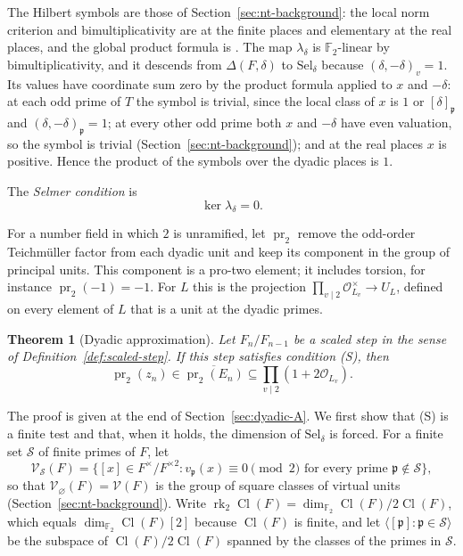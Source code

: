 \documentclass[11pt]{article}
\theoremstyle{plain}
\newtheorem{theorem}{Theorem}[section]
\theoremstyle{definition}
\theoremstyle{remark}
\DeclareMathOperator{\Cl}{Cl}
\newcommand{\F}{\mathbb F}
\newcommand{\OO}{\mathcal O}
\begin{document}
The Hilbert symbols are those of Section~\ref{sec:nt-background}: the
local norm criterion and bimultiplicativity are
\cite[Chapter~III, Theorem~4.4]{MilneCFT} at the finite places and
elementary at the real places, and the global product formula
is \cite[Chapter~V, Example~5.4]{MilneCFT}.  The map $\lambda_\delta$ is
$\F_2$-linear by bimultiplicativity, and it descends from
$\Delta(F,\delta)$ to $\mathrm{Sel}_\delta$ because
$(\delta,-\delta)_v=1$.  Its values have coordinate sum zero by the
product formula applied to $x$ and $-\delta$: at each odd prime of $T$
the symbol is trivial, since the local class of $x$ is $1$ or
$[\delta]_{\mathfrak p}$ and $(\delta,-\delta)_{\mathfrak p}=1$; at every
other odd prime both $x$ and $-\delta$ have even valuation, so the symbol
is trivial (Section~\ref{sec:nt-background}); and at the real places $x$
is positive.  Hence the product of the symbols over the dyadic places is
$1$.

The \emph{Selmer condition} is
\begin{equation}\label{eq:S}
 \tag{S} \ker\lambda_\delta=0.
\end{equation}

For a number field in which $2$ is unramified, let $\operatorname{pr}_2$
remove the odd-order Teichm\"uller factor from each dyadic unit and keep
its component in the group of principal units.  This component is a
pro-two element; it includes torsion, for instance
$\operatorname{pr}_2(-1)=-1$.  For $L$ this is the projection
$\prod_{v\mid2}\OO_{L_v}^\times\to U_L$, defined on every element of $L$
that is a unit at the dyadic primes.

\begin{theorem}[Dyadic approximation]\label{thm:dyadic}
Let $F_n/F_{n-1}$ be a scaled step in the sense of
Definition~\ref{def:scaled-step}.  If this step satisfies condition
\textup{(S)}, then
\[
 \operatorname{pr}_2(z_n)\in\overline{\operatorname{pr}_2(E_n)}
 \subseteq\prod_{v\mid2}(1+2\OO_{L_v}).
\]
\end{theorem}

The proof is given at the end of Section~\ref{sec:dyadic-A}.  We first
show that (S) is a finite test and that, when it holds, the dimension of
$\mathrm{Sel}_\delta$ is forced.  For a finite set $\mathcal S$ of finite
primes of $F$, let
\[
 \mathcal V_{\mathcal S}(F)=\{[x]\in F^\times/F^{\times2}:
 v_{\mathfrak p}(x)\equiv0\pmod2\text{ for every prime }\mathfrak p\notin\mathcal S\},
\]
so that $\mathcal V_\varnothing(F)=\mathcal V(F)$ is the group of square
classes of virtual units (Section~\ref{sec:nt-background}).  Write
$\operatorname{rk}_2\Cl(F)=\dim_{\F_2}\Cl(F)/2\Cl(F)$, which equals
$\dim_{\F_2}\Cl(F)[2]$ because $\Cl(F)$ is finite, and let
$\langle[\mathfrak p]:\mathfrak p\in\mathcal S\rangle$ be the subspace
of $\Cl(F)/2\Cl(F)$ spanned by the classes of the primes in $\mathcal S$.
\end{document}
